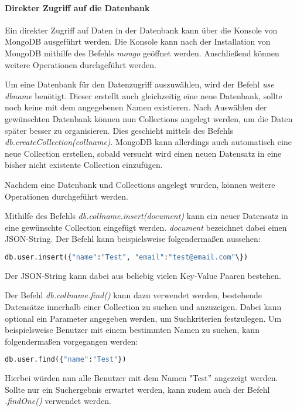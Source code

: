 \paragraph{Direkter Zugriff auf die Datenbank}
Ein direkter Zugriff auf Daten in der Datenbank kann über die Konsole von MongoDB ausgeführt werden. Die Konsole kann nach der Installation von MongoDB mithilfe des Befehls \textit{mongo} geöffnet werden. Anschließend können weitere Operationen durchgeführt werden.

Um eine Datenbank für den Datenzugriff auszuwählen, wird der Befehl \textit{use dbname} benötigt. Dieser erstellt auch gleichzeitig eine neue Datenbank, sollte noch keine mit dem angegebenen Namen existieren. Nach Auswählen der gewünschten Datenbank können nun Collections angelegt werden, um die Daten später besser zu organisieren. Dies geschieht mittels des Befehls \textit{db.createCollection(collname)}. MongoDB kann allerdings auch automatisch eine neue Collection erstellen, sobald versucht wird einen neuen Datensatz in eine bisher nicht existente Collection einzufügen.

Nachdem eine Datenbank und Collections angelegt wurden, können weitere Operationen durchgeführt werden.

Mithilfe des Befehls \textit{db.collname.insert(document)} kann ein neuer Datensatz in eine gewünschte Collection eingefügt werden. \textit{document} bezeichnet dabei einen JSON-String. Der Befehl kann beispielsweise folgendermaßen aussehen:\\
\begin{lstlisting}[caption=Einfügen eines neuen Datensatzes, language=Python]
db.user.insert({"name":"Test", "email":"test@email.com"\})
\end{lstlisting}
Der JSON-String kann dabei aus beliebig vielen Key-Value Paaren bestehen.

Der Befehl \textit{db.collname.find()} kann dazu verwendet werden, bestehende Datensätze innerhalb einer Collection zu suchen und anzuzeigen. Dabei kann optional ein Parameter angegeben werden, um  Suchkriterien festzulegen. Um beispielsweise Benutzer mit einem bestimmten Namen zu suchen, kann folgendermaßen vorgegangen werden:\\
\begin{lstlisting}[caption=Suchen nach Datensätzen, language=Python]
db.user.find({"name":"Test"})
\end{lstlisting}
Hierbei würden nun alle Benutzer mit dem Namen "Test'' angezeigt werden. Sollte nur ein Suchergebnis erwartet werden, kann zudem auch der Befehl \textit{.findOne()} verwendet werden.

